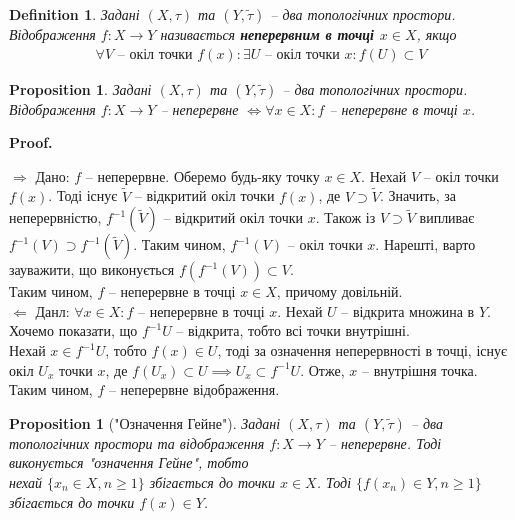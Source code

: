 \documentclass[a4paper, 10pt]{article}
\makeatletter
\def\rightproof{$\boxed{\Rightarrow}$ }
\def\leftproof{$\boxed{\Leftarrow}$ }
\theoremstyle{theoremdd}
\newtheorem{definition}[theorem]{Definition}
\newtheorem{proposition}[theorem]{Proposition}
\renewenvironment{proof}[1][Proof.\\]{\par
\pushQED{\hfill \qed}%
\normalfont \topsep6\p@\@plus6\p@\relax
\trivlist
\item\relax
{\bfseries
#1\@addpunct{.}}\hspace\labelsep\ignorespaces
}{%
\popQED\endtrivlist\@endpefalse
}
\makeatother
\begin{document}
\begin{definition}
Задані $(X,\tau)$ та $(Y,\tilde{\tau})$ -- два топологічних простори.\\
Відображення $f \colon X \to Y$ називається \textbf{неперервним в точці $x \in X$}, якщо
\begin{align*}
\forall V \text{ -- окіл точки } f(x) : \exists U \text{ -- окіл точки }x : f(U) \subset V
\end{align*}
\end{definition}

\begin{proposition}
Задані $(X,\tau)$ та $(Y,\tilde{\tau})$ -- два топологічних простори.\\
Відображення $f \colon X \to Y$ -- неперервне $\iff \forall x \in X: f $ -- неперервне в точці $x$.
\end{proposition}

\begin{proof}
\rightproof Дано: $f$ -- неперервне. Оберемо будь-яку точку $x \in X$. Нехай $V$ -- окіл точки $f(x)$. Тоді існує $\tilde{V}$ -- відкритий окіл точки $f(x)$, де $V \supset \tilde{V}$. Значить, за неперервністю, $f^{-1}(\tilde{V})$ -- відкритий окіл точки $x$. Також із $V \supset \tilde{V}$ випливає $f^{-1}(V) \supset f^{-1}(\tilde{V})$. Таким чином, $f^{-1}(V)$ -- окіл точки $x$. Нарешті, варто зауважити, що виконується $f(f^{-1}(V)) \subset V$.\\
Таким чином, $f$ -- неперервне в точці $x \in X$, причому довільній.
\bigskip \\
\leftproof Данл: $\forall x \in X: f $ -- неперервне в точці $x$. Нехай $U$ -- відкрита множина в $Y$. Хочемо показати, що $f^{-1}U$ -- відкрита, тобто всі точки внутрішні.\\
Нехай $x \in f^{-1}U$, тобто $f(x) \in U$, тоді за означення неперервності в точці, існує окіл $U_x$ точки $x$, де $f(U_x) \subset U \implies U_x \subset f^{-1}U$. Отже, $x$ -- внутрішня точка.\\
Таким чином, $f$ -- неперервне відображення.
\end{proof}

\begin{proposition}["Означення Гейне"]
Задані $(X,\tau)$ та $(Y,\tilde{\tau})$ -- два топологічних простори та відображення $f \colon X \to Y$ -- неперервне. Тоді виконується "означення Гейне", тобто\\
нехай $\{x_n \in X, n \geq 1\}$ збігається до точки $x \in X$. Тоді $\{f(x_n) \in Y, n \geq 1\}$ збігається до точки $f(x) \in Y$.
\end{proposition}
\end{document}
